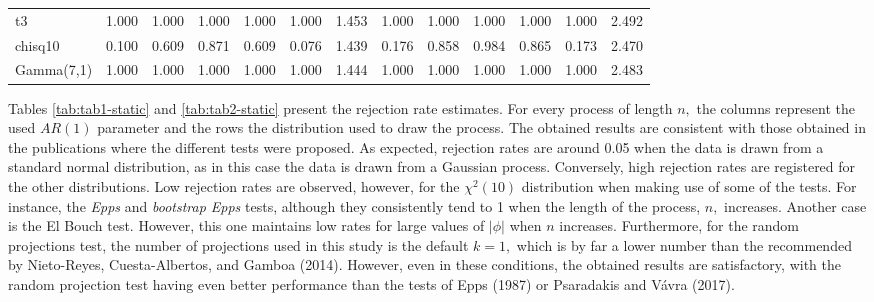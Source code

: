 \begin{table}[!h]
{\begin{tabular}[t]{lrrrrrrrrrrrr}
\hspace{1em}t3 & 1.000 & 1.000 & 1.000 & 1.000 & 1.000 & 1.453 & 1.000 & 1.000 & 1.000 & 1.000 & 1.000 & 2.492\\
\hspace{1em}chisq10 & 0.100 & 0.609 & 0.871 & 0.609 & 0.076 & 1.439 & 0.176 & 0.858 & 0.984 & 0.865 & 0.173 & 2.470\\
\hspace{1em}Gamma(7,1) & 1.000 & 1.000 & 1.000 & 1.000 & 1.000 & 1.444 & 1.000 & 1.000 & 1.000 & 1.000 & 1.000 & 2.483\\
\bottomrule
\end{tabular}}
\end{table}

Tables \ref{tab:tab1-static} and \ref{tab:tab2-static} present the rejection rate estimates. For every process of length \(n,\) the columns represent the used \(AR(1)\) parameter and the rows the distribution used to draw the process. The obtained results are consistent with those obtained in the publications where the different tests were proposed. As expected, rejection rates are around 0.05 when the data is drawn from a standard normal distribution, as in this case the data is drawn from a Gaussian process. Conversely, high rejection rates are registered for the other distributions. Low rejection rates are observed, however, for the \(\chi^2(10)\) distribution when making use of some of the tests. For instance, the \emph{Epps} and \emph{bootstrap Epps} tests, although they consistently tend to 1 when the length of the process, \(n,\) increases. Another case is the El Bouch test. However, this one maintains low rates for large values of \(|\phi|\) when \(n\) increases. Furthermore, for the random projections test, the number of projections used in this study is the default \(k = 1,\) which is by far a lower number than the recommended by Nieto-Reyes, Cuesta-Albertos, and Gamboa (2014). However, even in these conditions, the obtained results are satisfactory, with the random projection test having even better performance than the tests of Epps (1987) or Psaradakis and Vávra (2017).

